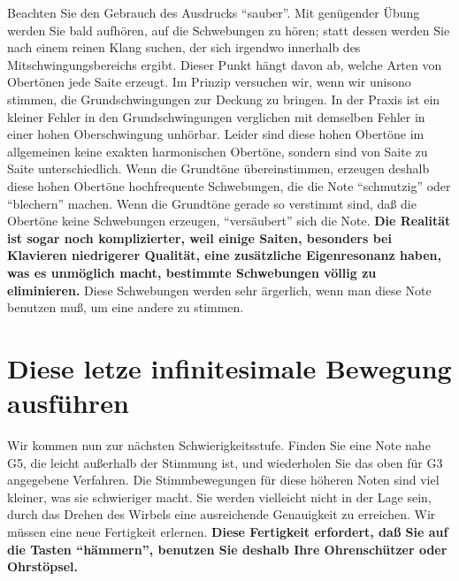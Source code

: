 Beachten Sie den Gebrauch des Ausdrucks \enquote{sauber}.
Mit genügender Übung werden Sie bald aufhören, auf die Schwebungen zu hören; statt dessen werden Sie nach einem reinen Klang suchen, der sich irgendwo innerhalb des Mitschwingungsbereichs ergibt.
Dieser Punkt hängt davon ab, welche Arten von Obertönen jede Saite erzeugt.
Im Prinzip versuchen wir, wenn wir unisono stimmen, die Grundschwingungen zur Deckung zu bringen.
In der Praxis ist ein kleiner Fehler in den Grundschwingungen verglichen mit demselben Fehler in einer hohen Oberschwingung unhörbar.
Leider sind diese hohen Obertöne im allgemeinen keine exakten harmonischen Obertöne, sondern sind von Saite zu Saite unterschiedlich.
Wenn die Grundtöne übereinstimmen, erzeugen deshalb diese hohen Obertöne hochfrequente Schwebungen, die die Note \enquote{schmutzig} oder \enquote{blechern} machen.
Wenn die Grundtöne gerade so verstimmt sind, daß die Obertöne keine Schwebungen erzeugen, \enquote{versäubert} sich die Note.
\textbf{Die Realität ist sogar noch komplizierter, weil einige Saiten, besonders bei Klavieren niedrigerer Qualität, eine zusätzliche Eigenresonanz haben, was es unmöglich macht, bestimmte Schwebungen völlig zu eliminieren.}
Diese Schwebungen werden sehr ärgerlich, wenn man diese Note benutzen muß, um eine andere zu stimmen.
 

\hypertarget{c2_5f}{}
\section{Diese letze infinitesimale Bewegung ausführen}
\label{c2_5_infi}

Wir kommen nun zur nächsten Schwierigkeitsstufe.
Finden Sie eine Note nahe G5, die leicht außerhalb der Stimmung ist, und wiederholen Sie das oben für G3 angegebene Verfahren.
Die Stimmbewegungen für diese höheren Noten sind viel kleiner, was sie schwieriger macht.
Sie werden vielleicht nicht in der Lage sein, durch das Drehen des Wirbels eine ausreichende Genauigkeit zu erreichen.
Wir müssen eine neue Fertigkeit erlernen.
\textbf{Diese Fertigkeit erfordert, daß Sie auf die Tasten \enquote{hämmern}, benutzen Sie deshalb Ihre Ohrenschützer oder Ohrstöpsel.}

